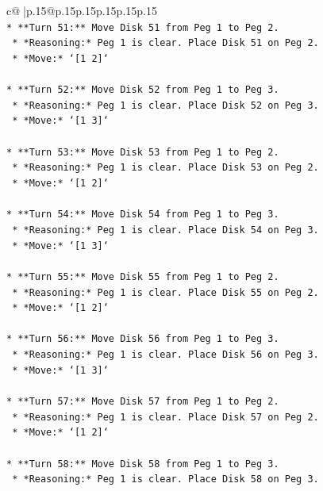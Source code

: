 \documentclass{article}
\begin{document}
{\begin{supertabular}{c@{$\;$}|p{.15\linewidth}@{}p{.15\linewidth}p{.15\linewidth}p{.15\linewidth}p{.15\linewidth}p{.15\linewidth}}
{{{\\ 
\texttt{*   **Turn 51:** Move Disk 51 from Peg 1 to Peg 2.} \\
\texttt{    *   *Reasoning:* Peg 1 is clear. Place Disk 51 on Peg 2.} \\
\texttt{    *   *Move:* `{[}1 2{]}`} \\
\\ 
\texttt{*   **Turn 52:** Move Disk 52 from Peg 1 to Peg 3.} \\
\texttt{    *   *Reasoning:* Peg 1 is clear. Place Disk 52 on Peg 3.} \\
\texttt{    *   *Move:* `{[}1 3{]}`} \\
\\ 
\texttt{*   **Turn 53:** Move Disk 53 from Peg 1 to Peg 2.} \\
\texttt{    *   *Reasoning:* Peg 1 is clear. Place Disk 53 on Peg 2.} \\
\texttt{    *   *Move:* `{[}1 2{]}`} \\
\\ 
\texttt{*   **Turn 54:** Move Disk 54 from Peg 1 to Peg 3.} \\
\texttt{    *   *Reasoning:* Peg 1 is clear. Place Disk 54 on Peg 3.} \\
\texttt{    *   *Move:* `{[}1 3{]}`} \\
\\ 
\texttt{*   **Turn 55:** Move Disk 55 from Peg 1 to Peg 2.} \\
\texttt{    *   *Reasoning:* Peg 1 is clear. Place Disk 55 on Peg 2.} \\
\texttt{    *   *Move:* `{[}1 2{]}`} \\
\\ 
\texttt{*   **Turn 56:** Move Disk 56 from Peg 1 to Peg 3.} \\
\texttt{    *   *Reasoning:* Peg 1 is clear. Place Disk 56 on Peg 3.} \\
\texttt{    *   *Move:* `{[}1 3{]}`} \\
\\ 
\texttt{*   **Turn 57:** Move Disk 57 from Peg 1 to Peg 2.} \\
\texttt{    *   *Reasoning:* Peg 1 is clear. Place Disk 57 on Peg 2.} \\
\texttt{    *   *Move:* `{[}1 2{]}`} \\
\\ 
\texttt{*   **Turn 58:** Move Disk 58 from Peg 1 to Peg 3.} \\
\texttt{    *   *Reasoning:* Peg 1 is clear. Place Disk 58 on Peg 3.} \\
}}}
\end{supertabular}}
\end{document}
